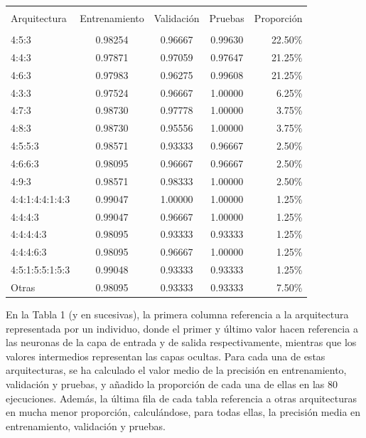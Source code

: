 \documentclass[spanish,a4paper,12pt,twoside]{report}
\begin{document}
  \begin{center}
     \label{table}
    \begin{tabular}{l c c c r}
      \hline \\ [-2ex]
      Arquitectura & Entrenamiento & Validación & Pruebas & Proporción \\ [0.5ex]
      \hline \\ [-1ex]
      4:5:3 & 0.98254 & 0.96667 & 0.99630 & 22.50\% \\
      4:4:3 & 0.97871 & 0.97059 & 0.97647 & 21.25\% \\
      4:6:3 & 0.97983 & 0.96275 & 0.99608 & 21.25\% \\
      4:3:3 & 0.97524 & 0.96667 & 1.00000 & 6.25\% \\ 
      4:7:3 & 0.98730 & 0.97778 & 1.00000 & 3.75\% \\ 
      4:8:3 & 0.98730 & 0.95556 & 1.00000 & 3.75\% \\
      4:5:5:3 & 0.98571 & 0.93333 & 0.96667 & 2.50\% \\
      4:6:6:3 & 0.98095 & 0.96667 & 0.96667 & 2.50\% \\
      4:9:3 & 0.98571 & 0.98333 & 1.00000 & 2.50\% \\ 
      4:4:1:4:4:1:4:3 & 0.99047 & 1.00000 & 1.00000 & 1.25\% \\
      4:4:4:3 & 0.99047 & 0.96667 & 1.00000 & 1.25\% \\
      4:4:4:4:3 & 0.98095 & 0.93333 & 0.93333 & 1.25\% \\
      4:4:4:6:3 & 0.98095 & 0.96667 & 1.00000 & 1.25\% \\
      4:5:1:5:5:1:5:3 & 0.99048 & 0.93333 & 0.93333 & 1.25\% \\ 
      Otras & 0.98095 & 0.93333 & 0.93333 & 7.50\% \\ [1ex]
      \hline
    \end{tabular}
  \end{center} \par
  En la Tabla 1 (y en sucesivas), la primera columna referencia a la arquitectura representada por un individuo, donde el primer y último valor hacen referencia a las neuronas de la capa de entrada y de salida respectivamente, mientras que los valores intermedios representan las capas ocultas. Para cada una de estas arquitecturas, se ha calculado el valor medio de la precisión en entrenamiento, validación y pruebas, y añadido la proporción de cada una de ellas en las 80 ejecuciones. Además, la última fila de cada tabla referencia a otras arquitecturas en mucha menor proporción, calculándose, para todas ellas, la precisión media en entrenamiento, validación y pruebas. \par
\end{document}
